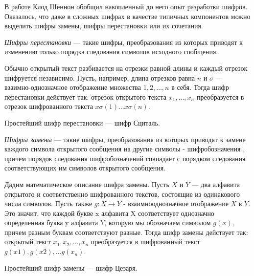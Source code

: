 В работе \cite{shannon-inf} Клод Шеннон обобщил накопленный до него опыт 
разработки шифров. Оказалось, что даже в сложных шифрах в качестве 
типичных компонентов можно выделить шифры замены, шифры перестановки 
или их сочетания.

\DEF\textit{Шифры перестановки} — такие шифры, преобразования из которых 
приводят к изменению только порядка следования символов исходного 
сообщения. 

Обычно открытый текст разбивается на отрезки равной длины 
и каждый отрезок шифруется независимо. Пусть, например, длина отрезков 
равна $n$ и $\sigma$ — взаимно-однозначное отображение множества 
${1, 2, \dots, n}$ в себя.
Тогда шифр перестановки действует так: отрезок открытого 
текста $x_1, \dots, x_n$ преобразуется в отрезок шифрованного текста 
$x \sigma(1)\dots x \sigma(n)$. 

Простейший шифр перестановки — шифр Сциталь.

\DEF\textit{Шифры замены} — такие шифры, преобразования из которых приводят 
к замене каждого символа открытого сообщения на другие символы - шифробозначения
, причем порядок следования шифробозначений совпадает с порядком следования 
соответствующих им символов открытого сообщения. 

Дадим математическое описание шифра замены. 
Пусть $X$ и $Y$ — два алфавита открытого и соответственно 
шифрованного текстов, состоящие из одинакового числа символов. Пусть 
также $g: X \rightarrow Y$ - взаимнооднозначное отображение $X$ в $Y$. Это значит,
что каждой букве x алфавита X соответствует однозначно определенная 
буква y алфавита $Y$, которую мы обозначаем символом $g(x)$, причем 
разным буквам соответствуют разные. Тогда шифр замены действует так:
открытый текст $x_1, x_2, \dots, x_n$ преобразуется в шифрованный текст 
$g(x1), g(x2), \dots g(x_n)$. 

Простейший шифр замены — шифр Цезаря. 
